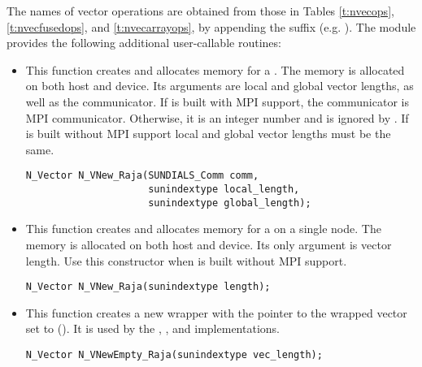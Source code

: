 The names of vector operations are obtained from those in Tables \ref{t:nvecops},
\ref{t:nvecfusedops}, and \ref{t:nvecarrayops}, by appending the suffix 
(e.g. ).
The module {\nvecraja}  provides the following additional user-callable routines:
\begin{itemize}



\item {}

  This function creates and allocates memory for a {\raja} .
  The memory is allocated on both host and device. Its arguments are local
  and global vector lengths, as well as the {\sundials} communicator. If
  {\sundials} is built with MPI support, the communicator is MPI communicator.
  Otherwise, it is an integer number and is ignored by .
  If {\sundials} is built without MPI support local and global vector
  lengths must be the same.

\begin{verbatim}
N_Vector N_VNew_Raja(SUNDIALS_Comm comm,
                     sunindextype local_length,
                     sunindextype global_length);
\end{verbatim}



\item {}

  This function creates and allocates memory for a {\raja} 
  on a single node. The memory is allocated on both host and device.
  Its only argument is vector length. Use this constructor when {\sundials}
  is built without MPI support.

\begin{verbatim}
N_Vector N_VNew_Raja(sunindextype length);
\end{verbatim}



\item {}

  This function creates a new {\nvector} wrapper with the pointer to
  the wrapped {\raja} vector set to (). It is used by the
  , , and 
  implementations.

\begin{verbatim}
N_Vector N_VNewEmpty_Raja(sunindextype vec_length);
\end{verbatim}



\end{itemize}
